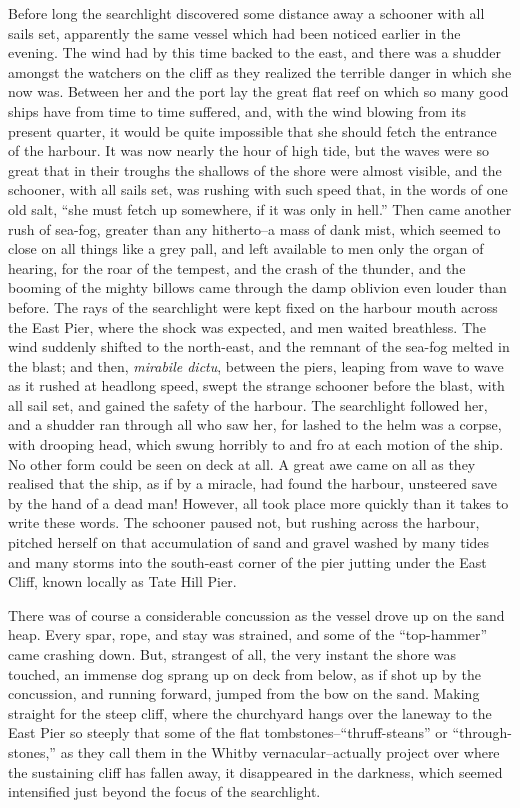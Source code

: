 \documentclass[12pt,openright]{book}
\begin{document}
Before long the searchlight discovered some distance away a schooner with all sails set, apparently the same vessel which had been noticed earlier in the evening. The wind had by this time backed to the east, and there was a shudder amongst the watchers on the cliff as they realized the terrible danger in which she now was. Between her and the port lay the great flat reef on which so many good ships have from time to time suffered, and, with the wind blowing from its present quarter, it would be quite impossible that she should fetch the entrance of the harbour. It was now nearly the hour of high tide, but the waves were so great that in their troughs the shallows of the shore were almost visible, and the schooner, with all sails set, was rushing with such speed that, in the words of one old salt, “she must fetch up somewhere, if it was only in hell.” Then came another rush of sea-fog, greater than any hitherto–a mass of dank mist, which seemed to close on all things like a grey pall, and left available to men only the organ of hearing, for the roar of the tempest, and the crash of the thunder, and the booming of the mighty billows came through the damp oblivion even louder than before. The rays of the searchlight were kept fixed on the harbour mouth across the East Pier, where the shock was expected, and men waited breathless. The wind suddenly shifted to the north-east, and the remnant of the sea-fog melted in the blast; and then, \textit{mirabile dictu}, between the piers, leaping from wave to wave as it rushed at headlong speed, swept the strange schooner before the blast, with all sail set, and gained the safety of the harbour. The searchlight followed her, and a shudder ran through all who saw her, for lashed to the helm was a corpse, with drooping head, which swung horribly to and fro at each motion of the ship. No other form could be seen on deck at all. A great awe came on all as they realised that the ship, as if by a miracle, had found the harbour, unsteered save by the hand of a dead man! However, all took place more quickly than it takes to write these words. The schooner paused not, but rushing across the harbour, pitched herself on that accumulation of sand and gravel washed by many tides and many storms into the south-east corner of the pier jutting under the East Cliff, known locally as Tate Hill Pier.

There was of course a considerable concussion as the vessel drove up on the sand heap. Every spar, rope, and stay was strained, and some of the “top-hammer” came crashing down. But, strangest of all, the very instant the shore was touched, an immense dog sprang up on deck from below, as if shot up by the concussion, and running forward, jumped from the bow on the sand. Making straight for the steep cliff, where the churchyard hangs over the laneway to the East Pier so steeply that some of the flat tombstones–“thruff-steans” or “through-stones,” as they call them in the Whitby vernacular–actually project over where the sustaining cliff has fallen away, it disappeared in the darkness, which seemed intensified just beyond the focus of the searchlight.
\end{document}
